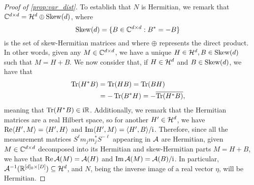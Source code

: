 \begin{proof}[Proof of \cref{prop:var_dist}]
  To establish that $N$ is Hermitian, we remark that $\mathbb{C}^{d \times d} = \mathcal{H}^d \oplus \operatorname{Skew}(d)$, where \[\operatorname{Skew}(d) = \{B \in \mathbb{C}^{d \times d} : B^* = -B\}\] is the set of skew-Hermitian matrices and where $\oplus$ represents the direct product.  In other words, given any $M \in \mathbb{C}^{d \times d}$, we have a unique $H \in \mathcal{H}^d, B \in \operatorname{Skew}(d)$ such that $M = H + B$.  We now consider that, if $H \in \mathcal{H}^d$ and $B \in \operatorname{Skew}(d)$, we have that
  \begin{align*}
    \operatorname{Tr}(H^* B) &= \operatorname{Tr}(H B) = \operatorname{Tr}(B H) \\
    &= -\operatorname{Tr}(B^* H) = - \overline{\operatorname{Tr}(H^* B)},
  \end{align*}
  meaning that $\operatorname{Tr}(H^* B) \in \mathrm{i} \mathbb{R}$.  Additionally, we remark that the Hermitian matrices are a real Hilbert space, so for another $H' \in \mathcal{H}^d$, we have $\operatorname{Re} \langle H', M\rangle = \langle H', H\rangle$ and $\operatorname{Im} \langle H', M\rangle = \langle H', B\rangle / \mathrm{i}$.  Therefore, since all the measurement matrices $S^\ell m_j m_j^* S^{- \ell}$ appearing in $\mathcal{A}$ are Hermitian, given $M \in \mathbb{C}^{d \times d}$ decomposed into its Hermitian and skew-Hermitian parts $M = H + B$, we have that $\operatorname{Re} \mathcal{A}(M) = \mathcal{A}(H)$ and $\operatorname{Im} \mathcal{A}(M) = \mathcal{A}(B) / \mathrm{i}$.  In particular, $\mathcal{A}^{-1}(\mathbb{R}^{[d]_0 \times [D]}) \subseteq \mathcal{H}^d$, and $N$, being the inverse image of a real vector $\eta$, will be Hermitian.


\end{proof}
